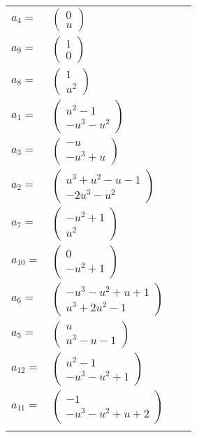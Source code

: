 \documentclass[1p]{elsarticle_modified}
\theoremstyle{definition}
\begin{document}
\begin{tabular}{m{7pt} m{180pt} m{7pt} m{180pt} }
\flushright $a_{4}=$&$\begin{pmatrix}0\\u\end{pmatrix}$ \\
\flushright $a_{9}=$&$\begin{pmatrix}1\\0\end{pmatrix}$ \\
\flushright $a_{8}=$&$\begin{pmatrix}1\\u^2\end{pmatrix}$ \\
\flushright $a_{1}=$&$\begin{pmatrix}u^2-1\\- u^3- u^2\end{pmatrix}$ \\
\flushright $a_{3}=$&$\begin{pmatrix}- u\\- u^3+u\end{pmatrix}$ \\
\flushright $a_{2}=$&$\begin{pmatrix}u^3+u^2- u-1\\-2 u^3- u^2\end{pmatrix}$ \\
\flushright $a_{7}=$&$\begin{pmatrix}- u^2+1\\u^2\end{pmatrix}$ \\
\flushright $a_{10}=$&$\begin{pmatrix}0\\- u^2+1\end{pmatrix}$ \\
\flushright $a_{6}=$&$\begin{pmatrix}- u^3- u^2+u+1\\u^3+2 u^2-1\end{pmatrix}$ \\
\flushright $a_{5}=$&$\begin{pmatrix}u\\u^3- u-1\end{pmatrix}$ \\
\flushright $a_{12}=$&$\begin{pmatrix}u^2-1\\- u^3- u^2+1\end{pmatrix}$ \\
\flushright $a_{11}=$&$\begin{pmatrix}-1\\- u^3- u^2+u+2\end{pmatrix}$\\&\end{tabular}
\end{document}
